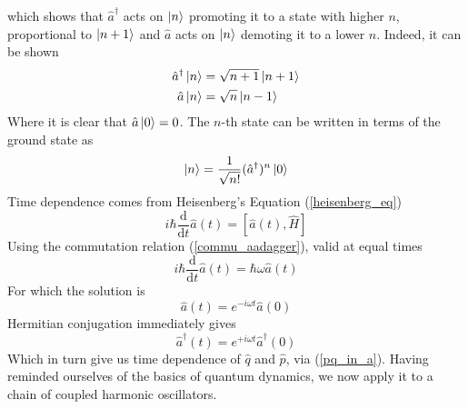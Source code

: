 which shows that $\hat{a}^\dagger$ acts on $\ket{n}$ promoting it to a state with higher $n$, proportional to $\ket{n+1}$ and $\hat{a}$  acts on $\ket{n}$ demoting it to a lower $n$. Indeed, it can be shown
\begin{equation}
\begin{aligned}
    \hat{a}^\dagger\ket{n}&=\sqrt{n+1}\ket{n+1}\\
    \hat{a}\ket{n}&=\sqrt{n}\ket{n-1}
\end{aligned}
\end{equation}
Where it is clear that $\hat{a}\ket{0}=0$. The $n$-th state can be written in terms of the ground state as
\begin{equation}
    \ket{n}=\frac{1}{\sqrt{n!}}(\hat{a}^\dagger)^n\ket{0}
\end{equation}
Time dependence comes from Heisenberg's Equation (\ref{heisenberg_eq})
\begin{equation}
i \hbar \frac{\mathrm{d}}{\mathrm{d} t} \hat{a}(t)=[\hat{a}(t), \hat{H}]
\end{equation}
Using the commutation relation (\ref{commu_aadagger}), valid at equal times
\begin{equation}
{i} \hbar \frac{\mathrm{d}}{\mathrm{d} t} \hat{a}(t)=\hbar \omega \hat{a}(t)
\end{equation}
For which the solution is
\begin{equation}
\hat{a}(t)={e}^{-{i} \omega t} \hat{a}(0)
\end{equation}
Hermitian conjugation immediately gives
\begin{equation}
\hat{a}^{\dagger}(t)={e}^{+{i} \omega t} \hat{a}^{\dagger}(0)
\end{equation}
Which in turn give us time dependence of $\hat{q}$ and $\hat{p}$, via (\ref{pq_in_a}). Having reminded ourselves of the basics of quantum dynamics, we now apply it to a chain of coupled harmonic oscillators.
